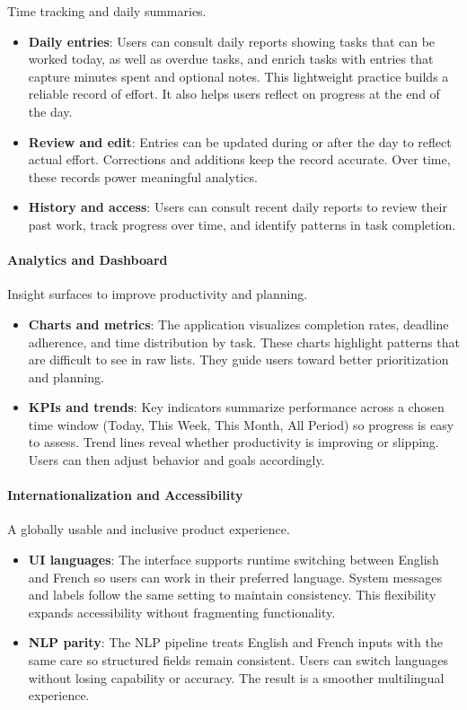 \documentclass[12pt,a4paper]{article}
\begin{document}
Time tracking and daily summaries.
\begin{itemize}
  \item \textbf{Daily entries}: Users can consult daily reports showing tasks that can be worked today, as well as overdue tasks, and enrich tasks with entries that capture minutes spent and optional notes. This lightweight practice builds a reliable record of effort. It also helps users reflect on progress at the end of the day.
  \item \textbf{Review and edit}: Entries can be updated during or after the day to reflect actual effort. Corrections and additions keep the record accurate. Over time, these records power meaningful analytics.
  \item \textbf{History and access}: Users can consult recent daily reports to review their past work, track progress over time, and identify patterns in task completion.
\end{itemize}

\paragraph{Analytics and Dashboard}\mbox{}

Insight surfaces to improve productivity and planning.
\begin{itemize}
  \item \textbf{Charts and metrics}: The application visualizes completion rates, deadline adherence, and time distribution by task. These charts highlight patterns that are difficult to see in raw lists. They guide users toward better prioritization and planning.
  \item \textbf{KPIs and trends}: Key indicators summarize performance across a chosen time window (Today, This Week, This Month, All Period) so progress is easy to assess. Trend lines reveal whether productivity is improving or slipping. Users can then adjust behavior and goals accordingly.
\end{itemize}

\paragraph{Internationalization and Accessibility}\mbox{}

A globally usable and inclusive product experience.
\begin{itemize}
  \item \textbf{UI languages}: The interface supports runtime switching between English and French so users can work in their preferred language. System messages and labels follow the same setting to maintain consistency. This flexibility expands accessibility without fragmenting functionality.
  \item \textbf{NLP parity}: The NLP pipeline treats English and French inputs with the same care so structured fields remain consistent. Users can switch languages without losing capability or accuracy. The result is a smoother multilingual experience.
\end{itemize}
\end{document}
